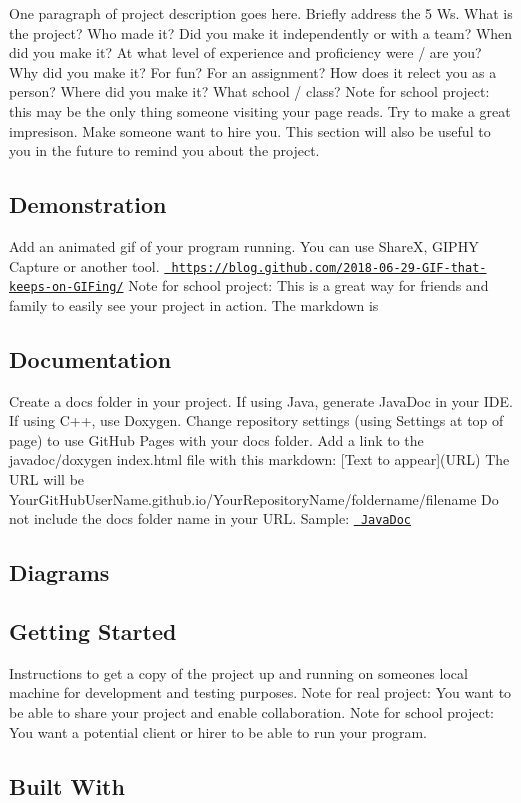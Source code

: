 One paragraph of project description goes here. Briefly address the 5 W\textquotesingle{}s. What is the project? Who made it? Did you make it independently or with a team? When did you make it? At what level of experience and proficiency were / are you? Why did you make it? For fun? For an assignment? How does it relect you as a person? Where did you make it? What school / class? Note for school project\+: this may be the only thing someone visiting your page reads. Try to make a great impresison. Make someone want to hire you. This section will also be useful to you in the future to remind you about the project. \subsection*{Demonstration}

Add an animated gif of your program running. You can use ShareX, G\+I\+P\+HY Capture or another tool. \href{https://blog.github.com/2018-06-29-GIF-that-keeps-on-GIFing/}{\texttt{ https\+://blog.\+github.\+com/2018-\/06-\/29-\/\+G\+I\+F-\/that-\/keeps-\/on-\/\+G\+I\+Fing/}} Note for school project\+: This is a great way for friends and family to easily see your project in action. The markdown is  \subsection*{Documentation}

Create a docs folder in your project. If using Java, generate Java\+Doc in your I\+DE. If using C++, use Doxygen. Change repository settings (using Settings at top of page) to use Git\+Hub Pages with your docs folder. Add a link to the javadoc/doxygen index.\+html file with this markdown\+: \mbox{[}Text to appear\mbox{]}(U\+RL) The U\+RL will be Your\+Git\+Hub\+User\+Name.\+github.\+io/\+Your\+Repository\+Name/foldername/filename Do not include the docs folder name in your U\+RL. Sample\+: \href{https://pv-cop.github.io/PV-README-TEMPLATE/javadoc/index.html}{\texttt{ Java\+Doc}} \subsection*{Diagrams}

\subsection*{Getting Started}

Instructions to get a copy of the project up and running on someone\textquotesingle{}s local machine for development and testing purposes. Note for real project\+: You want to be able to share your project and enable collaboration. Note for school project\+: You want a potential client or hirer to be able to run your program. \subsection*{Built With}



